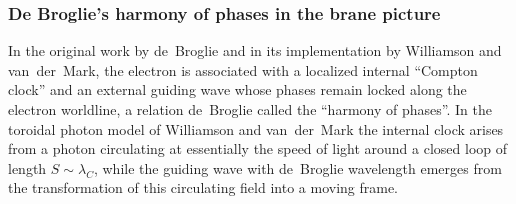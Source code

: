 \subsubsection{De Broglie's harmony of phases in the brane picture}
\label{subsec:harmony-phases}

In the original work by de~Broglie and in its implementation by
Williamson and van~der~Mark, the electron is associated with a
localized internal ``Compton clock'' and an external guiding wave
whose phases remain locked along the electron worldline, a relation
de~Broglie called the ``harmony of phases''. In the toroidal photon
model of Williamson and van~der~Mark the internal clock arises from a
photon circulating at essentially the speed of light around a closed
loop of length $S\sim\lambda_C$, while the guiding wave with
de~Broglie wavelength emerges from the transformation of this
circulating field into a moving frame.

